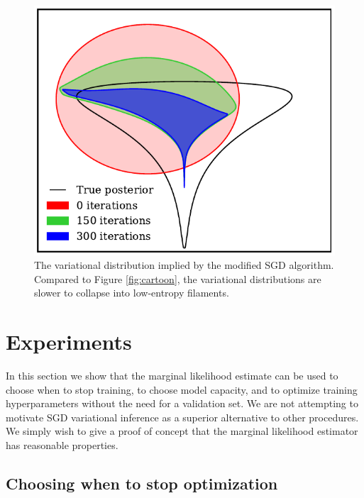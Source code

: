 \documentclass[]{article}
\begin{document}
\begin{figure}[h]
\vskip 0.2in
\begin{center}
\includegraphics[width=0.9\columnwidth]{../experiments/2015_03_02_funnel/3_grad_threshold/dists.pdf}
\caption{The variational distribution implied by the modified SGD algorithm.
Compared to Figure \ref{fig:cartoon}, the variational distributions are slower to collapse into low-entropy filaments.}
\label{fig:cartoon-fatter}
\end{center}
\end{figure}

\section{Experiments}
\label{sec:experiments}

In this section we show that the marginal likelihood estimate can be used to choose when to stop training, to choose model capacity, and to optimize training hyperparameters without the need for a validation set.
We are not attempting to motivate SGD variational inference as a superior alternative to other procedures. 
We simply wish to give a proof of concept that the marginal likelihood estimator has reasonable properties.

\subsection{Choosing when to stop optimization}
\end{document}
